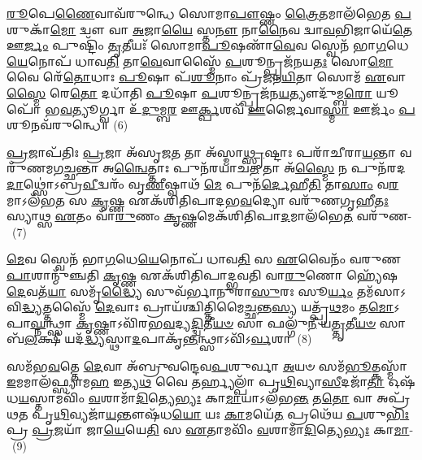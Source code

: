 \-\ul{𑌰𑍂}\-𑌪𑍇\-\ul{𑌣𑍈}\-𑌵𑌾𑌵᳴\-𑌰𑍁𑌨𑍍𑌧𑍇 𑌸𑍋𑌮𑌾\-\ul{𑌪𑍗}\-𑌷𑍍𑌣𑌂 \ul{𑌤𑍍𑌰𑍈}\-𑌤𑌮𑌾𑌲᳴𑌭𑍇𑌤 \ul{𑌪}\-𑌶𑍁𑌕𑌾᳴\-\ul{𑌮𑍋} 𑌦𑍍𑌵𑍗 𑌵𑌾 \ul{𑌅}\-𑌜𑌾\-\ul{𑌯𑍈} 𑌸𑍍𑌤\-\ul{𑌨𑍗} 𑌨𑌾\-\ul{𑌨𑍈}\-𑌵 𑌦𑍍𑌵𑌾\-\ul{𑌵}\-𑌭𑌿𑌜𑌾𑌯𑍇᳴\-\ul{𑌤𑍇} 𑌊\-\ul{𑌰𑍍𑌜𑌂} 𑌪𑍁𑌷𑍍𑌟𑌿𑌂᳴ \ul{𑌤𑍃}\-𑌤𑍀𑌯𑌃᳴ 𑌸𑍋𑌮𑌾\-\ul{𑌪𑍂}\-𑌷𑌣𑌾᳴\-\ul{𑌵𑍇}\-𑌵 𑌸𑍍𑌵𑍇𑌨᳴ 𑌭𑌾\-\ul{𑌗}\-𑌧𑍇\-\ul{𑌯𑍇}\-𑌨𑍋𑌪᳴ 𑌧𑌾𑌵\-\ul{𑌤𑌿} 𑌤𑌾\-\ul{𑌵𑍇}\-𑌵𑌾𑌸𑍍𑌮𑍈᳴ \ul{𑌪}\-𑌶𑍂𑌨𑍍𑌪𑍍𑌰𑌜᳴𑌨𑌯\-\ul{𑌤𑌃} 𑌸𑍋\-\ul{𑌮𑍋} 𑌵𑍈 𑌰𑍇᳴\-\ul{𑌤𑍋}\-𑌧𑌾𑌃 \ul{𑌪𑍂}\-𑌷𑌾 𑌪᳴\-\ul{𑌶𑍂}\-𑌨𑌾𑌂 𑌪𑍍𑌰᳴𑌜𑌨\-\ul{𑌯𑌿}\-𑌤𑌾 𑌸𑍋𑌮᳴ \ul{𑌏}\-𑌵𑌾\-\ul{𑌸𑍍𑌮𑍈} 𑌰𑍇\-\ul{𑌤𑍋} 𑌦𑌧𑌾᳴𑌤𑌿 \ul{𑌪𑍂}\-𑌷𑌾 \ul{𑌪}\-𑌶𑍂𑌨𑍍𑌪𑍍𑌰𑌜᳴𑌨\-\ul{𑌯}\-𑌤𑍍𑌯𑍗𑌦𑍁᳴𑌮𑍍𑌬\-\ul{𑌰𑍋} 𑌯𑍂𑌪𑍋᳴ 𑌭\-\ul{𑌵}\-𑌤𑍍𑌯𑍂𑌰𑍍𑌗𑍍𑌵𑌾 𑌉᳴\-\ul{𑌦𑍁}\-𑌮𑍍𑌬\-\ul{𑌰} 𑌊\-\ul{𑌰𑍍𑌕𑍍𑌪}\-𑌶𑌵᳴ \ul{𑌊}\-𑌰𑍍𑌜𑍈𑌵𑌾\-\ul{𑌸𑍍𑌮𑌾} 𑌊𑌰𑍍𑌜𑌂᳴ \ul{𑌪}\-𑌶𑍂𑌨𑌵᳴\-𑌰𑍁𑌨𑍍𑌧𑍇॥~(6)

{\anuvakamend[{𑌭𑌵᳴\-\ul{𑌤𑍍𑌯𑍇}\-𑌵 \ul{𑌪𑍍𑌰}\-𑌜𑌾𑌯𑌾᳴ \ul{𑌆}\-𑌮𑌯᳴𑌤𑌿 \ul{𑌵𑌾}\-𑌯𑍁\-\ul{𑌮𑍇}\-𑌵 \ul{𑌨𑌿}\-𑌯𑍁𑌤𑍍𑌵᳴\-\ul{𑌨𑍍𑌤}\-\-\ul{𑍟} 𑌸𑍍𑌵𑍇𑌨᳴ 𑌭𑌾\-\ul{𑌗}\-𑌧𑍇\-\ul{𑌯𑍇}\-𑌨𑍋𑌪᳴ \ul{𑌪𑍍𑌰}\-𑌜𑌾𑌕𑌾᳴\-\ul{𑌮}\-𑌸𑍍𑌤𑌾𑌨𑍍 𑌯𑍂\-\ul{𑌪}\-𑌸𑍍𑌤𑍍𑌰𑌯𑍋᳴𑌦𑌶 𑌚।}]}

\-\ul{𑌪𑍍𑌰}\-𑌜𑌾𑌪᳴𑌤𑌿𑌃 \ul{𑌪𑍍𑌰}\-𑌜𑌾 𑌅᳴𑌸𑍃𑌜\-\ul{𑌤} 𑌤𑌾 𑌅᳴𑌸𑍍𑌮𑌾\-\ul{𑌥𑍍𑌸𑍃}\-𑌷𑍍𑌟𑌾𑌃 𑌪𑌰𑌾᳴𑌚𑍀𑌰𑌾\-\ul{𑌯}\-𑌨𑍍𑌤𑌾 𑌵𑌰𑍁᳴𑌣𑌮𑌗\-\ul{𑌚𑍍𑌛}\-𑌨𑍍𑌤𑌾 𑌅\-\ul{𑌨𑍍𑌵𑍈}\-𑌤𑍍𑌤𑌾𑌃 𑌪𑍁𑌨᳴𑌰𑌯𑌾𑌚\-\ul{𑌤} 𑌤𑌾 𑌅᳴\-\ul{𑌸𑍍𑌮𑍈} 𑌨 𑌪𑍁𑌨᳴𑌰𑌦\-\ul{𑌦𑌾}\-𑌥𑍍𑌸𑍋॑\-𑌽𑌬𑍍𑌰\-\ul{𑌵𑍀}\-𑌦𑍍𑌵𑌰𑌂᳴ 𑌵𑍃\-\ul{𑌣𑍀}\-𑌷𑍍𑌵𑌾𑌥᳴ \ul{𑌮𑍇} 𑌪𑍁𑌨᳴\-\ul{𑌰𑍍𑌦𑍇}\-𑌹𑍀\-\ul{𑌤𑌿} 𑌤𑌾\-\ul{𑌸𑌾𑌂} 𑌵\-\ul{𑌰}\-𑌮𑌾\-𑌽𑌲᳴𑌭\-\ul{𑌤} 𑌸 \ul{𑌕𑍃}\-𑌷𑍍𑌣 𑌏𑌕᳴𑌶𑌿𑌤𑌿𑌪𑌾𑌦𑌭\-\ul{𑌵}\-𑌦𑍍𑌯𑍋 𑌵𑌰𑍁᳴𑌣𑌗𑍃𑌹𑍀\-\ul{𑌤𑌃} 𑌸𑍍𑌯𑌾𑌥𑍍𑌸 \ul{𑌏}\-𑌤𑌂 𑌵𑌾᳴\-\ul{𑌰𑍁}\-𑌣𑌂 \ul{𑌕𑍃}\-𑌷𑍍𑌣𑌮𑍇𑌕᳴𑌶𑌿𑌤𑌿𑌪𑌾\-\ul{𑌦}\-𑌮𑌾\-𑌲᳴𑌭𑍇\-\ul{𑌤} 𑌵𑌰𑍁᳴𑌣-~(7)

\-\ul{𑌮𑍇}\-𑌵 𑌸𑍍𑌵𑍇𑌨᳴ 𑌭𑌾\-\ul{𑌗}\-𑌧𑍇\-\ul{𑌯𑍇}\-𑌨𑍋𑌪᳴ 𑌧𑌾𑌵\-\ul{𑌤𑌿} 𑌸 \ul{𑌏}\-𑌵𑍈𑌨𑌂᳴ 𑌵𑌰𑍁𑌣\-\ul{𑌪𑌾}\-𑌶𑌾𑌨𑍍𑌮𑍁᳴𑌞𑍍𑌚𑌤𑌿 \ul{𑌕𑍃}\-𑌷𑍍𑌣 𑌏𑌕᳴𑌶𑌿𑌤𑌿𑌪𑌾𑌦𑍍𑌭𑌵𑌤𑌿 𑌵𑌾\-\ul{𑌰𑍁}\-𑌣𑍋 𑌹𑍍𑌯𑍇᳴𑌷 \ul{𑌦𑍇}\-𑌵𑌤᳴\-\ul{𑌯𑌾} 𑌸𑌮𑍃᳴\-\ul{𑌦𑍍𑌧𑍍𑌯𑍈} 𑌸𑍁𑌵᳴𑌰𑍍𑌭𑌾𑌨𑍁𑌰𑌾\-\ul{𑌸𑍁}\-𑌰𑌃 𑌸𑍂\-\ul{𑌰𑍍𑌯𑌂} 𑌤𑌮᳴𑌸𑌾\-𑌽𑌵𑌿\-\ul{𑌦𑍍𑌧𑍍𑌯}\-𑌤𑍍𑌤𑌸𑍍𑌮𑍈᳴ \ul{𑌦𑍇}\-𑌵𑌾𑌃 𑌪𑍍𑌰𑌾𑌯᳴𑌶𑍍𑌚𑌿𑌤𑍍𑌤𑌿𑌮𑍈\-\ul{𑌚𑍍𑌛}\-𑌨𑍍𑌤\-\ul{𑌸𑍍𑌯} 𑌯𑌤𑍍𑌪𑍍𑌰᳴\-\ul{𑌥}\-𑌮𑌂 𑌤\-\ul{𑌮𑍋}\-\-𑌽𑌪𑌾\-\ul{𑌘𑍍𑌨}\-𑌨𑍍𑌥𑍍𑌸𑌾 \ul{𑌕𑍃}\-𑌷𑍍𑌣𑌾\-𑌽𑌵𑌿᳴𑌰𑌭\-\ul{𑌵}\-𑌦𑍍𑌯\-\ul{𑌦𑍍𑌦𑍍𑌵𑌿}\-𑌤𑍀\-\ul{𑌯}\-\-\ul{𑍞} 𑌸𑌾 𑌫𑌲𑍍𑌗𑍁᳴\-\ul{𑌨𑍀} 𑌯\-\ul{𑌤𑍍𑌤𑍃}\-𑌤𑍀\-\ul{𑌯}\-\-\ul{𑍞} 𑌸𑌾 𑌬᳴\-\ul{𑌲}\-𑌕𑍍𑌷𑍀 𑌯𑌦᳴\-\ul{𑌦𑍍𑌧𑍍𑌯}\-𑌸𑍍𑌥𑌾\-\ul{𑌦}\-𑌪𑌾𑌕𑍃᳴\-\ul{𑌨𑍍𑌤}\-𑌨𑍍𑌥𑍍𑌸𑌾\-𑌽𑌵𑌿᳴\-𑌽\-\ul{𑌰𑍍𑌵}\-𑌶𑌾~(8)

𑌸𑌮᳴𑌭\-\ul{𑌵}\-𑌤𑍍𑌤𑍇 \ul{𑌦𑍇}\-𑌵𑌾 𑌅᳴𑌬𑍍𑌰𑍁𑌵𑌨𑍍𑌦𑍇𑌵\-\ul{𑌪}\-𑌶𑍁𑌰𑍍𑌵𑌾 \ul{𑌅}\-𑌯𑍞 𑌸𑌮᳴\-\ul{𑌭𑍂}\-𑌤𑍍𑌕𑌸𑍍𑌮𑌾᳴ \ul{𑌇}\-𑌮𑌮𑌾𑌲᳴𑌫𑍍𑌸𑍍𑌯𑌾𑌮\-\ul{𑌹} 𑌇𑌤𑍍𑌯\-\ul{𑌥} 𑌵𑍈 𑌤𑌰𑍍𑌹𑍍𑌯𑌲𑍍𑌪𑌾᳴ 𑌪𑍃\-\ul{𑌥𑌿}\-𑌵𑍍𑌯𑌾\-\ul{𑌸𑍀}\-𑌦𑌜𑌾᳴\-\ul{𑌤𑌾} 𑌓𑌷᳴𑌧\-\ul{𑌯}\-𑌸𑍍𑌤𑌾𑌮𑌵𑌿𑌂᳴ \ul{𑌵}\-𑌶𑌾𑌮𑌾᳴\-\ul{𑌦𑌿}\-𑌤𑍍𑌯𑍇\-\ul{𑌭𑍍𑌯𑌃} 𑌕𑌾\-\ul{𑌮𑌾}\-𑌯𑌾\-𑌽𑌲᳴𑌭\-\ul{𑌨𑍍𑌤} 𑌤\-\ul{𑌤𑍋} 𑌵𑌾 𑌅𑌪𑍍𑌰᳴𑌥𑌤 𑌪𑍃\-\ul{𑌥𑌿}\-𑌵𑍍𑌯𑌜𑌾᳴\-\ul{𑌯}\-𑌨𑍍𑌤𑍗𑌷᳴𑌧\-\ul{𑌯𑍋} 𑌯𑌃 \ul{𑌕𑌾}\-𑌮𑌯𑍇᳴\-\ul{𑌤} 𑌪𑍍𑌰𑌥𑍇᳴𑌯 \ul{𑌪}\-𑌶𑍁\-\ul{𑌭𑌿𑌃} 𑌪𑍍𑌰 \ul{𑌪𑍍𑌰}\-𑌜𑌯𑌾᳴ 𑌜𑌾\-\ul{𑌯𑍇}\-𑌯𑍇\-\ul{𑌤𑌿} 𑌸 \ul{𑌏}\-𑌤𑌾𑌮𑌵𑌿𑌂᳴ \ul{𑌵}\-𑌶𑌾𑌮𑌾᳴\-\ul{𑌦𑌿}\-𑌤𑍍𑌯𑍇\-\ul{𑌭𑍍𑌯𑌃} 𑌕𑌾\-\ul{𑌮𑌾}\--~(9)

